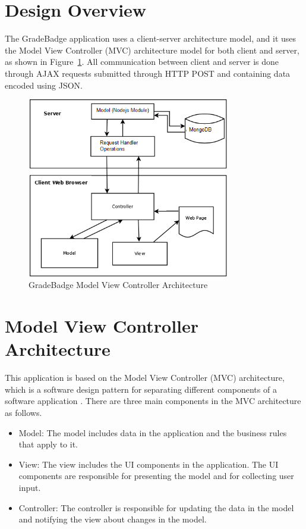 \lstset{breaklines=true}

\section{Design Overview}
The GradeBadge application uses a client-server architecture model, and it uses the Model View Controller (MVC) architecture model for both client and server, as shown in Figure~\ref{fig:mvc}.  All communication between client and server is done through AJAX requests submitted through HTTP POST and containing data encoded using JSON. 

\vspace{3em}
\begin{figure}[H]
\begin{center}
\includegraphics[height=3.1in,width=3.5in]{images/mvc_diagram.png}
\caption{GradeBadge Model View Controller Architecture}
\label{fig:mvc}
\end{center}
\end{figure}   

\section{Model View Controller Architecture}
This application is based on the Model View Controller (MVC) architecture,
which is a software design pattern for separating different components of a software application \cite{MVC}. There are three main components in the MVC architecture as follows.

\begin{itemize}
\item Model: The model includes data in the application and the business rules that apply to it.
\item View: The view includes the UI components in the application. The UI components are responsible for presenting the model and for collecting user input.
\item Controller: The controller is responsible for updating the data in the model and notifying the view about changes in the model.
\end{itemize}

